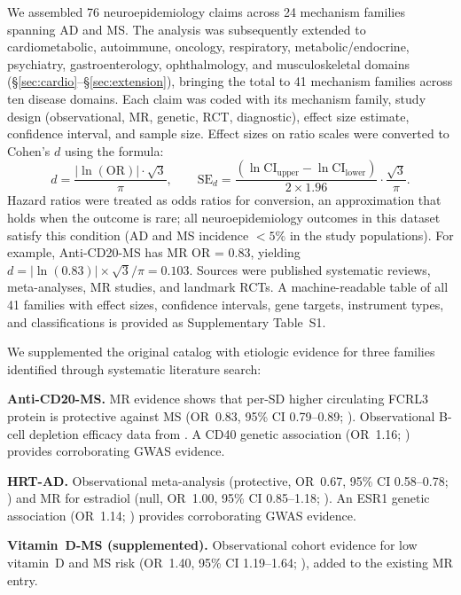 \documentclass[11pt]{article}
\begin{document}
We assembled 76 neuroepidemiology claims across 24 mechanism families spanning AD and MS. The analysis was subsequently extended to cardiometabolic, autoimmune, oncology, respiratory, metabolic/endocrine, psychiatry, gastroenterology, ophthalmology, and musculoskeletal domains (\S\ref{sec:cardio}--\S\ref{sec:extension}), bringing the total to 41 mechanism families across ten disease domains. Each claim was coded with its mechanism family, study design (observational, MR, genetic, RCT, diagnostic), effect size estimate, confidence interval, and sample size. Effect sizes on ratio scales were converted to Cohen's $d$ using the \citet{chinn2000} formula:
\begin{equation}
d = \frac{|\ln(\text{OR})| \cdot \sqrt{3}}{\pi}, \qquad
\text{SE}_d = \frac{(\ln\text{CI}_{\text{upper}} - \ln\text{CI}_{\text{lower}})}{2 \times 1.96} \cdot \frac{\sqrt{3}}{\pi}.
\label{eq:chinn}
\end{equation}
Hazard ratios were treated as odds ratios for conversion, an approximation that holds when the outcome is rare; all neuroepidemiology outcomes in this dataset satisfy this condition (AD and MS incidence $< 5\%$ in the study populations). For example, Anti-CD20-MS has MR OR = 0.83, yielding $d = |\ln(0.83)| \times \sqrt{3}/\pi = 0.103$. Sources were published systematic reviews, meta-analyses, MR studies, and landmark RCTs. A machine-readable table of all 41 families with effect sizes, confidence intervals, gene targets, instrument types, and classifications is provided as Supplementary Table~S1.

We supplemented the original catalog with etiologic evidence for three families identified through systematic literature search:

\textbf{Anti-CD20-MS.} MR evidence shows that per-SD higher circulating FCRL3 protein is protective against MS (OR~0.83, 95\% CI 0.79--0.89; \cite{lin2023}). Observational B-cell depletion efficacy data from \citet{hu2019}. A CD40 genetic association (OR~1.16; \cite{sokolova2013}) provides corroborating GWAS evidence.

\textbf{HRT-AD.} Observational meta-analysis (protective, OR~0.67, 95\% CI 0.58--0.78; \cite{song2020}) and MR for estradiol (null, OR~1.00, 95\% CI 0.85--1.18; \cite{barth2025}). An ESR1 genetic association (OR~1.14; \cite{cheng2014}) provides corroborating GWAS evidence.

\textbf{Vitamin~D-MS (supplemented).} Observational cohort evidence for low vitamin~D and MS risk (OR~1.40, 95\% CI 1.19--1.64; \cite{munger2006}), added to the existing MR entry.
\end{document}

